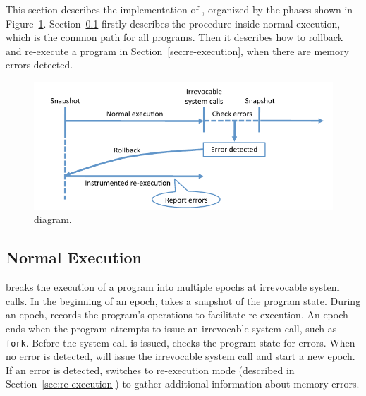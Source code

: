 \label{sec:implementation}

This section describes the implementation of \doubletake{}, organized by the phases
shown in Figure~\ref{fig:phases}. 
Section~\ref{sec:normal_execution} firstly describes the procedure inside normal execution, which
is the common path for all programs.
Then it describes how to rollback and re-execute a program in Section~\ref{sec:re-execution}, when
there are memory errors detected.

\begin{figure}[t] {
	\centering
	\includegraphics[width=6.5in]{doubletake/figure/overview}
	\caption{\DoubleTake{} diagram. \label{fig:phases}}
	}
\end{figure}

\subsection{Normal Execution}
\label{sec:normal_execution}

\doubletake{} breaks the execution of a program into multiple epochs at irrevocable system calls.
In the beginning of an epoch, \doubletake{} takes a snapshot of the program state. 
During an epoch, \doubletake{} records the program's operations to facilitate re-execution. 
An epoch ends when the program attempts to issue an irrevocable system call, such as \texttt{fork}. 
Before the system call is issued, \doubletake{} checks the program state for errors. 
When no error is detected, \doubletake{} will issue the irrevocable system call and start a new epoch.
If an error is detected, \doubletake{} switches to re-execution mode 
(described in Section~\ref{sec:re-execution}) to gather additional information about memory errors. 

